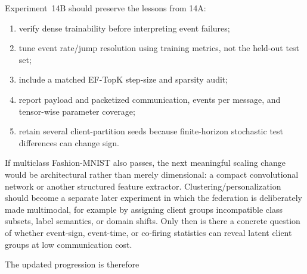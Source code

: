 Experiment~14B should preserve the lessons from 14A:
\begin{enumerate}
    \item verify dense trainability before interpreting event failures;
    \item tune event rate/jump resolution using training metrics, not the held-out test set;
    \item include a matched EF-TopK step-size and sparsity audit;
    \item report payload and packetized communication, events per message, and tensor-wise parameter coverage;
    \item retain several client-partition seeds because finite-horizon stochastic test differences can change sign.
\end{enumerate}

If multiclass Fashion-MNIST also passes, the next meaningful scaling change would be architectural rather than merely dimensional: a compact convolutional network or another structured feature extractor. Clustering/personalization should become a separate later experiment in which the federation is deliberately made multimodal, for example by assigning client groups incompatible class subsets, label semantics, or domain shifts. Only then is there a concrete question of whether event-sign, event-time, or co-firing statistics can reveal latent client groups at low communication cost.

The updated progression is therefore
\begin{center}
\end{center}
